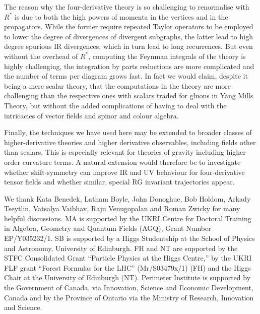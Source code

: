 \documentclass[a4paper,11pt]{article}
\begin{document}
The reason why the four-derivative theory is so challenging to renormalise with $R^*$ is due to both the high powers of momenta in the vertices and in the propagators. While the former require repeated Taylor operators to be employed to lower the degree of divergences of divergent subgraphs, the latter lead to high degree spurious IR divergences, which in turn lead to long recurrences. But even without the overhead of $R^*$, computing the Feynman integrals of the theory is highly challenging, the integration by parts reductions are more complicated and the number of terms per diagram grows fast. In fact we would claim, despite it being a mere scalar theory, that the computations in the theory are more challenging than the respective ones with scalars traded for gluons in Yang Mills Theory, but without the added complications of having to deal with the intricacies of vector fields and spinor and colour algebra. 

Finally, the techniques we have used here may be extended to broader classes of higher-derivative theories and higher derivative observables, including fields other than scalars. This is especially relevant for theories of gravity including higher-order curvature terms. A natural extension would therefore be to investigate whether shift-symmetry can improve IR and UV behaviour for four-derivative tensor fields and whether similar, special RG invariant trajectories appear.

\appendix

\acknowledgments
We thank Kata Benedek, Latham Boyle, John Donoghue, Bob Holdom, Arkady Tseytlin, Vatsalya Vaibhav, Raju Venugopalan and Roman Zwicky for many helpful discussions. MA is supported by the UKRI Centre for Doctoral Training in Algebra, Geometry and Quantum Fields (AGQ), Grant Number EP/Y035232/1. SB is supported by a Higgs Studentship at the School of Physics and Astronomy, University of Edinburgh. FH and NT are supported by the STFC Consolidated Grant ``Particle Physics at the Higgs Centre,'' by the UKRI FLF grant ``Forest Formulas for the LHC'' (Mr/S03479x/1) (FH) and the Higgs Chair at the University of Edinburgh (NT). Perimeter Institute is supported by the Government of Canada, via Innovation, Science and Economic Development, Canada and by the Province of Ontario via the Ministry of Research, Innovation and Science.



\end{document}
